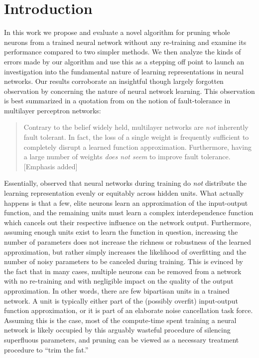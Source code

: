 \section{Introduction}\label{sec1}

In this work we propose and evaluate a novel algorithm for pruning whole neurons from a trained neural network without any re-training and examine its performance compared to two simpler methods. We then analyze the kinds of errors made by our algorithm and use this as a stepping off point to launch an investigation into the fundamental nature of learning representations in neural networks. Our results corroborate an insightful though largely forgotten observation by \cite{mozer1989skeletonization} concerning the nature of neural network learning. This observation is best summarized in a quotation from \cite{segee1991fault} on the notion of fault-tolerance in multilayer perceptron networks:

\begin{quotation}
Contrary to the belief widely held, multilayer networks are \textit{not} inherently fault tolerant. In fact, the loss of a single weight is frequently sufficient to completely disrupt a learned function approximation. Furthermore, having a large number of weights \textit{does not seem} to improve fault tolerance. [Emphasis added]
\end{quotation}

Essentially, \cite{mozer1989using} observed that neural networks during training do \textit{not} distribute the learning representation evenly or equitably across hidden units. What actually happens is that a few, elite neurons learn an approximation of the input-output function, and the remaining units must learn a complex interdependence function which cancels out their respective influence on the network output. Furthermore, assuming enough units exist to learn the function in question, increasing the number of parameters does not increase the richness or robustness of the learned approximation, but rather simply increases the likelihood of overfitting and the number of noisy parameters to be canceled during training. This is evinced by the fact that in many cases, multiple neurons can be removed from a network with no re-training and with negligible impact on the quality of the output approximation. In other words, there are few bipartisan units in a trained network. A unit is typically either part of the (possibly overfit) input-output function approximation, or it is part of an elaborate noise cancellation task force. Assuming this is the case, most of the compute-time spent training a neural network is likely occupied by this arguably wasteful procedure of silencing superfluous parameters, and pruning can be viewed as a necessary treatment procedure to ``trim the fat.''

